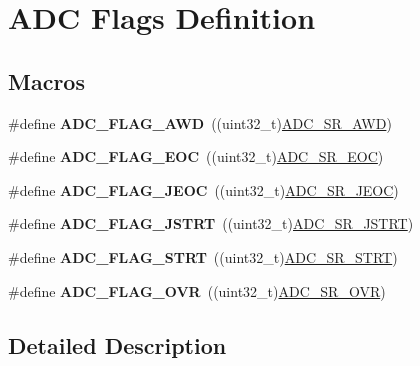 \hypertarget{group___a_d_c__flags__definition}{}\section{A\+DC Flags Definition}
\label{group___a_d_c__flags__definition}
\subsection*{Macros}
\begin{DoxyCompactItemize}
\item 
\mbox{\label{group___a_d_c__flags__definition_gadb75a4b430fb84950232b7a8f3a6a877}} 
\#define {\bfseries A\+D\+C\+\_\+\+F\+L\+A\+G\+\_\+\+A\+WD}~((uint32\+\_\+t)\mbox{\hyperlink{group___peripheral___registers___bits___definition_ga8b7f27694281e4cad956da567e5583b2}{A\+D\+C\+\_\+\+S\+R\+\_\+\+A\+WD}})
\item 
\mbox{\label{group___a_d_c__flags__definition_gaf2c6fdf7e9ab63b778149e5fb56413d4}} 
\#define {\bfseries A\+D\+C\+\_\+\+F\+L\+A\+G\+\_\+\+E\+OC}~((uint32\+\_\+t)\mbox{\hyperlink{group___peripheral___registers___bits___definition_ga3dc295c5253743aeb2cda582953b7b53}{A\+D\+C\+\_\+\+S\+R\+\_\+\+E\+OC}})
\item 
\mbox{\label{group___a_d_c__flags__definition_ga4df8eea8ab83d98104ee15a339743a4e}} 
\#define {\bfseries A\+D\+C\+\_\+\+F\+L\+A\+G\+\_\+\+J\+E\+OC}~((uint32\+\_\+t)\mbox{\hyperlink{group___peripheral___registers___bits___definition_gabc9f07589bb1a4e398781df372389b56}{A\+D\+C\+\_\+\+S\+R\+\_\+\+J\+E\+OC}})
\item 
\mbox{\label{group___a_d_c__flags__definition_ga278f4e866f4322c1120bf0db5301c432}} 
\#define {\bfseries A\+D\+C\+\_\+\+F\+L\+A\+G\+\_\+\+J\+S\+T\+RT}~((uint32\+\_\+t)\mbox{\hyperlink{group___peripheral___registers___bits___definition_ga7340a01ffec051c06e80a037eee58a14}{A\+D\+C\+\_\+\+S\+R\+\_\+\+J\+S\+T\+RT}})
\item 
\mbox{\label{group___a_d_c__flags__definition_gad0c59ae7749c69b5b91f2c533db1b619}} 
\#define {\bfseries A\+D\+C\+\_\+\+F\+L\+A\+G\+\_\+\+S\+T\+RT}~((uint32\+\_\+t)\mbox{\hyperlink{group___peripheral___registers___bits___definition_ga45eb11ad986d8220cde9fa47a91ed222}{A\+D\+C\+\_\+\+S\+R\+\_\+\+S\+T\+RT}})
\item 
\mbox{\label{group___a_d_c__flags__definition_ga6e8f399d2af342bd18b9f5803cb986e7}} 
\#define {\bfseries A\+D\+C\+\_\+\+F\+L\+A\+G\+\_\+\+O\+VR}~((uint32\+\_\+t)\mbox{\hyperlink{group___peripheral___registers___bits___definition_ga1e5211d5e3e53cdedf4d9d6fe4ce2a45}{A\+D\+C\+\_\+\+S\+R\+\_\+\+O\+VR}})
\end{DoxyCompactItemize}


\subsection{Detailed Description}
